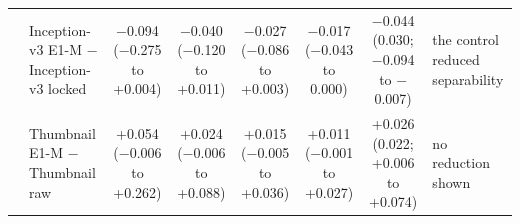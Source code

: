 \begin{longtable}{@{}llcccccp{3cm}@{}}
 & Inception-v3 E1-M $-$ Inception-v3 locked & \makecell{$-$0.094\\{\scriptsize ($-$0.275 to +0.004)}} & \makecell{$-$0.040\\{\scriptsize ($-$0.120 to +0.011)}} & \makecell{$-$0.027\\{\scriptsize ($-$0.086 to +0.003)}} & \makecell{$-$0.017\\{\scriptsize ($-$0.043 to 0.000)}} & \makecell{$-$0.044\\{\scriptsize (0.030; $-$0.094 to $-$0.007)}} & the control reduced separability \\
 & Thumbnail E1-M $-$ Thumbnail raw & \makecell{+0.054\\{\scriptsize ($-$0.006 to +0.262)}} & \makecell{+0.024\\{\scriptsize ($-$0.006 to +0.088)}} & \makecell{+0.015\\{\scriptsize ($-$0.005 to +0.036)}} & \makecell{+0.011\\{\scriptsize ($-$0.001 to +0.027)}} & \makecell{+0.026\\{\scriptsize (0.022; +0.006 to +0.074)}} & no reduction shown \\
\end{longtable}
